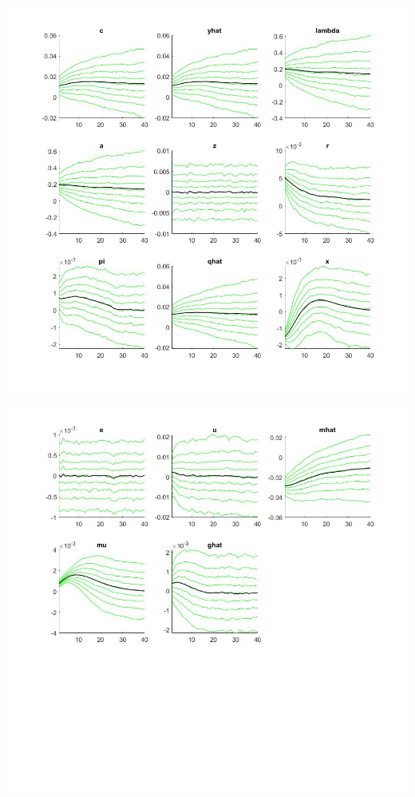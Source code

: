 \documentclass[11pt,preprint, authoryear]{elsarticle}
\let\origfigure\figure
\let\endorigfigure\endfigure
\renewenvironment{figure}[1][2] {
    \expandafter\origfigure\expandafter[H]
} {
    \endorigfigure
}
\numberwithin{equation}{section}
\numberwithin{figure}{section}
\numberwithin{table}{section}
\begin{document}
\begin{figure}
    \centering 
    \begin{minipage}[t]{8.2cm} 
        \centering 
        \includegraphics[width=\linewidth]{flex_fore_var1.jpg} 
    \end{minipage} 
    \hspace{0.1cm} 
    \begin{minipage}[t]{8.2cm} 
        \centering 
        \includegraphics[width=\linewidth]{flex_fore_var2.jpg} 
    \end{minipage}
    \caption{Forecasted Variables (point) - Flexible Money Growth Rule}
    \label{flex_point}
\end{figure}
\end{document}

